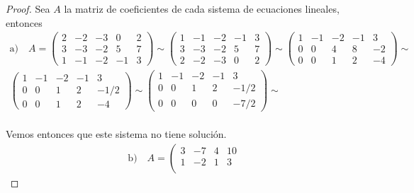 \documentclass[11pt,letterpaper]{article}
\begin{document}
\begin{proof}
    Sea $A$ la matriz de coeficientes de cada sistema de ecuaciones lineales, entonces\,\\
    \begin{align*}
        \text{a)} \quad A =
            \left(
            \begin{array}{cccc|c}
                2 & -2 & -3 & 0 & 2 \\
                3 & -3 & -2 & 5 & 7 \\
                1 & -1 & -2 & -1 & 3
            \end{array}\right) \sim
            \left(
            \begin{array}{cccc|c}
                1 & -1 & -2 & -1 & 3 \\
                3 & -3 & -2 & 5 & 7\\
                2 & -2 & -3 & 0 & 2
            \end{array}\right) \sim
            \left(
            \begin{array}{cccc|c}
                1 & -1 & -2 & -1 & 3 \\
                0 & 0 & 4 & 8 & -2\\
                0 & 0 & 1 & 2 & -4
            \end{array}\right) \sim \\[10pt]
            \left(
            \begin{array}{cccc|c}
                1 & -1 & -2 & -1 &3\\
                0 & 0 & 1 & 2 & -1/2\\
                0 & 0 & 1 & 2 & -4
            \end{array}\right) \sim
            \left(
            \begin{array}{cccc|c}
                1 & -1 & -2 & -1 & 3\\
                0 & 0 & 1 & 2 & -1/2\\
                0 & 0 & 0 & 0 & -7/2
            \end{array}\right) \sim
    \end{align*}
    \,\\
Vemos entonces que este sistema no tiene solución.\,\\
    \begin{align*}
        \text{b)} \quad A=
        \left(
        \begin{array}{ccc|c}
        3 & -7 & 4 & 10 \\
        1 & -2 & 1 & 3 \\

\end{array}
\end{align*}
\end{proof}
\end{document}
